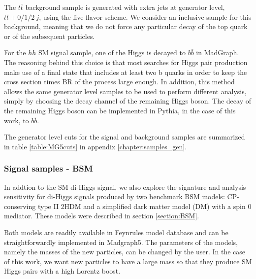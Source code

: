 
The $t\overline{t}$ background sample is generated with extra jets at generator level, $t\overline{t}+0/1/2 ~j$, using the five flavor scheme. We consider an inclusive sample for this background, meaning that we do not force any particular decay of the top quark or of the subsequent particles.
 
For the $hh$ SM signal sample, one of the Higgs is decayed to $b\overline{b}$ in MadGraph. The reasoning behind this choice is that most searches for Higgs pair production make use of a final state that includes at least two b quarks in order to keep the cross section times BR of the process large enough. In addition, this method allows the same generator level samples to be used to perform different analysis, simply by choosing the decay channel of the remaining Higgs boson. The decay of the remaining Higgs boson can be implemented in Pythia, in the case of this work, to $b\overline{b}$.

The generator level cuts for the signal and background samples are summarized in table \ref{table:MG5cuts} in appendix \ref{chapter:samples_gen}. 

\subsubsection{Signal samples - BSM} 

In addtion to the SM di-Higgs signal, we also explore the signature and analysis sensitivity for di-Higgs signals produced by two benchmark BSM models: CP-conserving type II 2HDM and a simplified dark matter model (DM) with a spin 0 mediator. These models were described in section \ref{section:BSM}.

Both models are readily available in Feynrules \cite{Feynrules} model database and can be straightforwardly implemented in Madgraph5. The parameters of the models, namely the masses of the new particles, can be changed by the user. In the case of this work, we want new particles to have a large mass so that they produce SM Higgs pairs with a high Lorentz boost. 

